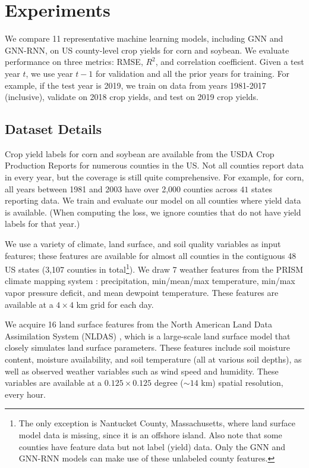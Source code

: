 \section{Experiments}



We compare 11 representative machine learning models, including GNN and GNN-RNN, on US county-level crop yields for corn and soybean. We evaluate performance on three metrics: RMSE, $R^2$, and correlation coefficient. Given a test year $t$, we use year $t-1$ for validation and all the prior years for training. For example, if the test year is 2019, we train on data from years 1981-2017 (inclusive), validate on 2018 crop yields, and test on 2019 crop yields.

\subsection{Dataset Details}


Crop yield labels for corn and soybean are available from the USDA Crop Production Reports \cite{usda2013national} for numerous counties in the US. Not all counties report data in every year, but the coverage is still quite comprehensive. For example, for corn, all years between 1981 and 2003 have over 2,000 counties across $41$ states reporting data. We train and evaluate our model on all counties where yield data is available. (When computing the loss, we ignore counties that do not have yield labels for that year.)

We use a variety of climate, land surface, and soil quality variables as input features; these features are available for almost all counties in the contiguous 48 US states (3,107 counties in total\footnote{The only exception is Nantucket County, Massachusetts, where land surface model data is missing, since it is an offshore island. Also note that some counties have feature data but not label (yield) data. Only the GNN and GNN-RNN models can make use of these unlabeled county features.}). We draw 7 weather features from the PRISM climate mapping system \cite{daly2013prism}: precipitation, min/mean/max temperature, min/max vapor pressure deficit, and mean dewpoint temperature. These features are available at a $4 \times 4$ km grid for each day. 

We acquire 16 land surface features from the North American Land Data Assimilation System (NLDAS) \cite{xia2012continental}, which is a large-scale land surface model that closely simulates land surface parameters. These features include soil moisture content, moisture availability, and soil temperature (all at various soil depths), as well as observed weather variables such as wind speed and humidity. These variables are available at a $0.125 \times 0.125$ degree ($\sim 14$ km) spatial resolution, every hour. 

